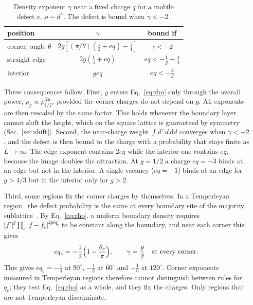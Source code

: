 \documentclass[aps,pre,twocolumn,superscriptaddress,nofootinbib,floatfix]{revtex4-2}
\newcommand{\dd}{\mathrm{d}}
\begin{document}
\begin{table}[t]
\caption{Density exponent $\gamma$ near a fixed charge $q$ for a mobile defect $e$, $\rho\sim d^{\gamma}$. The defect is bound when $\gamma<-2$.}
\label{tab:gamma}
\begin{ruledtabular}
\begin{tabular}{lcc}
position & $\gamma$ & bound if \\ \hline
corner, angle $\theta$ & $2g[(\pi/\theta)(\tfrac12+eq)-\tfrac14]$ & $\gamma<-2$\\
straight edge & $2g(\tfrac14+eq)$ & $eq<-\tfrac1g-\tfrac14$\\
interior & $geq$ & $eq<-\tfrac2g$\\
\end{tabular}
\end{ruledtabular}
\end{table}

Three consequences follow. First, $g$ enters Eq.~\eqref{eq:rho} only through the overall power, $\rho_g\propto\rho_{1/2}^{\,2g}$, provided the corner charges do not depend on $g$. All exponents are then rescaled by the same factor. This holds whenever the boundary layer cannot shift the height, which on the square lattice is guaranteed by symmetry (Sec.~\ref{sec:shift}). Second, the near-charge weight $\int d^{\gamma}\,d\,\dd d$ converges when $\gamma<-2$, and the defect is then bound to the charge with a probability that stays finite as $L\to\infty$. The edge exponent contains $2eq$ while the interior one contains $eq$, because the image doubles the attraction. At $g=1/2$ a charge $eq=-3$ binds at an edge but not in the interior. A single vacancy ($eq=-1$) binds at an edge for $g>4/3$ but in the interior only for $g>2$.

Third, some regions fix the corner charges by themselves. In a Temperleyan region~\cite{KenyonProppWilson,Kenyon2001} the defect probability is the same at every boundary site of the majority sublattice~\cite{TzengWu2003}. By Eq.~\eqref{eq:rho}, a uniform boundary density requires $|f'|^{g}\prod_c|f-f_c|^{2geq_c}$ to be constant along the boundary, and near each corner this gives
\begin{equation}
eq_c=-\frac12\Bigl(1-\frac{\theta_c}{\pi}\Bigr),\qquad \gamma=\frac g2\quad\text{at every corner}.
\label{eq:temperley}
\end{equation}
This gives $eq_c=-\tfrac14$ at $90^\circ$, $-\tfrac13$ at $60^\circ$ and $-\tfrac16$ at $120^\circ$. Corner exponents measured in Temperleyan regions therefore cannot distinguish between rules for $q_c$; they test Eq.~\eqref{eq:rho} as a whole, and they fix the charges. Only regions that are not Temperleyan discriminate.
\end{document}
